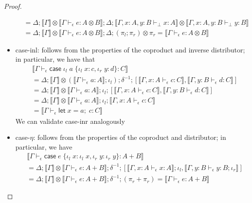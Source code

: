 \documentclass[acmsmall,screen,review]{acmart}
\newcommand{\ms}[1]{\ensuremath{\mathsf{#1}}}
\newcommand{\lto}{:}
\newcommand{\linl}[1]{\iota_l\;{#1}}
\newcommand{\linr}[1]{\iota_r\;{#1}}
\newcommand{\letexpr}[3]{\ensuremath{\ms{let}\;#1 = #2;\;#3}}
\newcommand{\caseexpr}[5]{\ms{case}\;#1\;\{\linl{#2} \lto #3, \linr{#4} \lto #5\}}
\newcommand{\bhyp}[2]{#1 : #2}
\newcommand{\hasty}[4]{#1 \vdash_{#2} #3: {#4}}
\newcommand{\brle}[1]{{\textsf{#1}}}
\newcommand{\dnt}[1]{\llbracket{#1}\rrbracket}
\begin{document}
\begin{proof}
\begin{itemize}[leftmargin=*]
\begin{align*}
      &= \Delta ; \dnt{\Gamma} \otimes \dnt{\hasty{\Gamma}{\epsilon}{e}{A \otimes B}}
                ; \Delta ; 
                \dnt{\hasty{\Gamma, \bhyp{x}{A}, \bhyp{y}{B}}{\bot}{x}{A}} \otimes
                \dnt{\hasty{\Gamma, \bhyp{x}{A}, \bhyp{y}{B}}{\bot}{y}{B}} \\
      &= \Delta ; \dnt{\Gamma} \otimes \dnt{\hasty{\Gamma}{\epsilon}{e}{A \otimes B}}
                ; \Delta ; (\pi_l ; \pi_r) \otimes \pi_r
       = \dnt{\hasty{\Gamma}{\epsilon}{e}{A \otimes B}}
    \end{align*}
    \item \brle{case-inl}: follows from the properties of the coproduct and inverse distributor; in
    particular, we have that
    \begin{align*}
      & \dnt{\hasty{\Gamma}{\epsilon}{\caseexpr{\linl{a}}{x}{c}{y}{d}}{C}}
      \\ &= \Delta 
      ; \dnt{\Gamma} \otimes (\dnt{\hasty{\Gamma}{\epsilon}{a}{A}} ; \iota_l)
      ; \delta^{-1} ; [
        \dnt{\hasty{\Gamma, \bhyp{x}{A}}{\epsilon}{c}{C}}, 
        \dnt{\hasty{\Gamma, \bhyp{y}{B}}{\epsilon}{d}{C}}
      ]
      \\ &= \Delta 
      ; \dnt{\Gamma} \otimes \dnt{\hasty{\Gamma}{\epsilon}{a}{A}}
      ; \iota_l ; [
        \dnt{\hasty{\Gamma, \bhyp{x}{A}}{\epsilon}{c}{C}}, 
        \dnt{\hasty{\Gamma, \bhyp{y}{B}}{\epsilon}{d}{C}}
      ]
      \\ &= \Delta 
      ; \dnt{\Gamma} \otimes \dnt{\hasty{\Gamma}{\epsilon}{a}{A}}
      ; \iota_l ; \dnt{\hasty{\Gamma, \bhyp{x}{A}}{\epsilon}{c}{C}}
      \\ &= \dnt{\hasty{\Gamma}{\epsilon}{\letexpr{x}{a}{c}}{C}}
    \end{align*}
    We can validate \brle{case-inr} analogously
    \item \brle{case-$\eta$}: follows from the properties of the coproduct and distributor; in
    particular, we have
    \begin{align*}
      & \dnt{\hasty{\Gamma}{\epsilon}{\caseexpr{e}{x}{\linl{x}}{y}{\linr{y}}}{A + B}} \\
      &= \Delta ; \dnt{\Gamma} \otimes \dnt{\hasty{\Gamma}{\epsilon}{e}{A + B}} ; \delta^{-1} ; [
        \dnt{\hasty{\Gamma, \bhyp{x}{A}}{\epsilon}{x}{A}};\iota_l,
        \dnt{\hasty{\Gamma, \bhyp{y}{B}}{\epsilon}{y}{B};\iota_r}
      ] \\
      &= \Delta ; \dnt{\Gamma} \otimes \dnt{\hasty{\Gamma}{\epsilon}{e}{A + B}} 
                ; \delta^{-1} ; (\pi_r + \pi_r)
      = \dnt{\hasty{\Gamma}{\epsilon}{e}{A + B}} 

\end{align*}
\end{itemize}
\end{proof}
\end{document}
